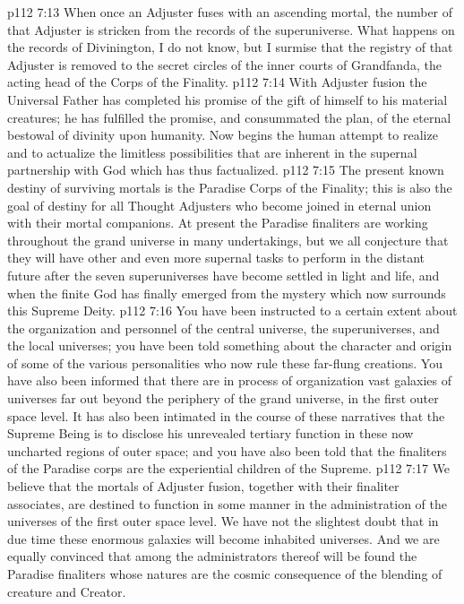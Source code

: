 \vs p112 7:13 When once an Adjuster fuses with an ascending mortal, the number of that Adjuster is stricken from the records of the superuniverse. What happens on the records of Divinington, I do not know, but I surmise that the registry of that Adjuster is removed to the secret circles of the inner courts of Grandfanda, the acting head of the Corps of the Finality.
\vs p112 7:14 With Adjuster fusion the Universal Father has completed his promise of the gift of himself to his material creatures; he has fulfilled the promise, and consummated the plan, of the eternal bestowal of divinity upon humanity. Now begins the human attempt to realize and to actualize the limitless possibilities that are inherent in the supernal partnership with God which has thus factualized.
\vs p112 7:15 \pc The present known destiny of surviving mortals is the Paradise Corps of the Finality; this is also the goal of destiny for all Thought Adjusters who become joined in eternal union with their mortal companions. At present the Paradise finaliters are working throughout the grand universe in many undertakings, but we all conjecture that they will have other and even more supernal tasks to perform in the distant future after the seven superuniverses have become settled in light and life, and when the finite God has finally emerged from the mystery which now surrounds this Supreme Deity.
\vs p112 7:16 You have been instructed to a certain extent about the organization and personnel of the central universe, the superuniverses, and the local universes; you have been told something about the character and origin of some of the various personalities who now rule these far\hyp{}flung creations. You have also been informed that there are in process of organization vast galaxies of universes far out beyond the periphery of the grand universe, in the first outer space level. It has also been intimated in the course of these narratives that the Supreme Being is to disclose his unrevealed tertiary function in these now uncharted regions of outer space; and you have also been told that the finaliters of the Paradise corps are the experiential children of the Supreme.
\vs p112 7:17 We believe that the mortals of Adjuster fusion, together with their finaliter associates, are destined to function in some manner in the administration of the universes of the first outer space level. We have not the slightest doubt that in due time these enormous galaxies will become inhabited universes. And we are equally convinced that among the administrators thereof will be found the Paradise finaliters whose natures are the cosmic consequence of the blending of creature and Creator.
